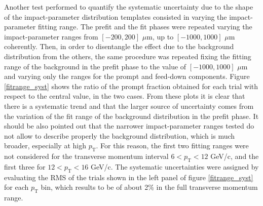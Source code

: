\documentclass[b5paper,10pt,twoside,oldstyle,classica]{toptesi}
\newcommand{\pt}{p_\text{T}}
\begin{document}
Another test performed to quantify the systematic uncertainty due to the shape of the impact-parameter distribution templates consisted in varying the impact-parameter fitting range. The prefit and the fit phases were repeated varying the impact-parameter ranges from $[-200,200]$ $\mu$m, up to $[-1000,1000]$ $\mu$m coherently. Then, in order to disentangle the effect due to the background distribution from the others, the same procedure was repeated fixing the fitting range of the background in the prefit phase to the value of $[-1000,1000]$ $\mu$m and varying only the ranges for the prompt and feed-down components. Figure \ref{fitrange_syst} shows the ratio of the prompt fraction obtained for each trial with respect to the central value, in the two cases. From these plots it is clear that there is a systematic trend and that the larger source of uncertainty comes from the variation of the fit range of the background distribution in the prefit phase. It should be also pointed out that the narrower impact-parameter ranges tested do not allow to describe properly the background distribution, which is much broader, especially at high $\pt$. For this reason, the first two fitting ranges were not considered for the transverse momentum interval $6<\pt<12$ GeV/c, and the first three for $12<\pt<16$ GeV/c. The systematic uncertainties were assigned by evaluating the RMS of the trials shown in the left panel of figure \ref{fitrange_syst} for each $\pt$ bin, which results to be of about 2\% in the full transverse momentum range.  
\end{document}
